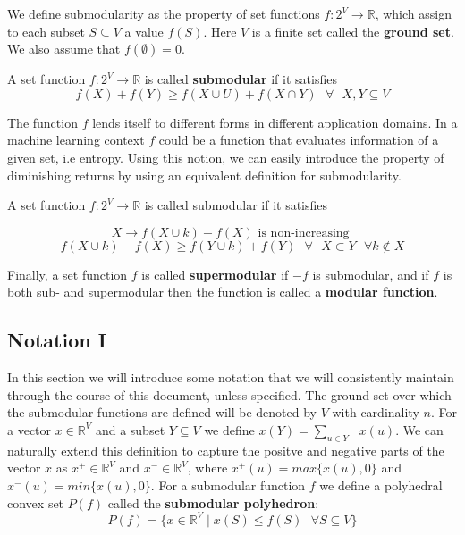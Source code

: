 We define submodularity as the property of set functions $f:2^V \rightarrow \mathds{R}$, which assign to each subset $S \subseteq V$ a value $f(S)$. Here $V$ is a finite set called the {\bf ground set}. We also assume that $f(\emptyset) = 0$.

\begin{definitions}
A set function $f:2^V \rightarrow \mathds{R}$ is called \textbf{submodular} if it satisfies
\[
 f(X) + f(Y) \geq f(X \cup U) + f(X \cap Y) \text{  } \forall \text{  } X,Y \subseteq V
\]
\end{definitions}

The function $f$ lends itself to different forms in different application domains. In a machine learning context $f$ could be a function that evaluates information of a given set, i.e entropy. Using this notion, we can easily introduce the property of diminishing returns by using an equivalent definition for submodularity.

\begin{definitions}
A set function $f:2^V \rightarrow \mathds{R}$ is called submodular if it satisfies

\[
 X \rightarrow f(X\cup {k}) - f(X) \text{ is non-increasing }
 \]
 \[
 f(X \cup {k}) - f(X) \geq f(Y \cup {k}) + f(Y) \text{  } \forall \text{  } X\subset Y \text{  } \forall k \notin X
\]
\end{definitions}

Finally, a set function $f$ is called {\bf supermodular} if $-f$ is submodular, and if $f$ is both sub- and supermodular then the function is called a {\bf modular function}.

\subsection{Notation I}
\label{sec:notation}
In this section we will introduce some notation that we will consistently maintain through the course of this document, unless specified. The ground set over which the submodular functions are defined will be denoted by $V$ with cardinality $n$. For a vector $x \in \mathds{R}^V$ and a subset $Y \subseteq V$ we define $x(Y) = \underset{u \in Y}{\operatorname{\sum }}\text{ } x(u)$. We can naturally extend this definition to capture the positve and negative parts of the vector $x$ as $x^+\in \mathds{R}^V$ and $x^-\in \mathds{R}^V$, where $x^+(u) = max\{x(u),0\}$ and $x^-(u) = min\{x(u),0\}$. For a submodular function $f$ we define a polyhedral convex set $P(f)$ called the {\bf submodular polyhedron}:\\
\[
 P(f) = \{ x\in \mathds{R}^V \mid x(S) \leq f(S) \text{ }\forall S\subseteq V \}
\]

